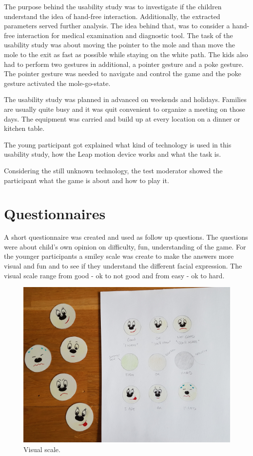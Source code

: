 The purpose behind the usability study was to investigate if the children understand the idea of hand-free interaction. Additionally, the extracted parameters served further analysis. The idea behind that, was to consider a hand-free interaction for medical examination and diagnostic tool. The task of the usability study was about moving the pointer to the mole and than move the mole to the exit as fast as possible while staying on the white path.
The kids also had to perform two gestures in additional, a pointer gesture and a poke gesture. The pointer gesture was needed to navigate and control the game and the poke gesture activated the mole-go-state.

The usability study was planned in advanced on weekends and holidays. Families are usually quite busy and it was quit convenient to organize a meeting on those days.
The equipment was carried and build up at every location on a dinner or kitchen table.

The young participant got explained what kind of technology is used in this usability study, how the Leap motion device works and what the task is.

Considering the still unknown technology, the test moderator showed the participant what the game is about and how to play it. 




\section{Questionnaires}

A short questionnaire was created and used as follow up questions. The questions were about child's own opinion on difficulty, fun, understanding of the game. For the younger participants a smiley scale was create to make the answers more visual and fun and to see if they understand the different facial expression.
The visual scale range from  good - ok to not good and from easy - ok to hard.

\begin{figure}[h]  %
  \centering
  \includegraphics[width=.5\textwidth]{figures/scale.jpg}
  \caption[Visual scale.]{Visual scale.}
  \label{fig:setup}
\end{figure}

